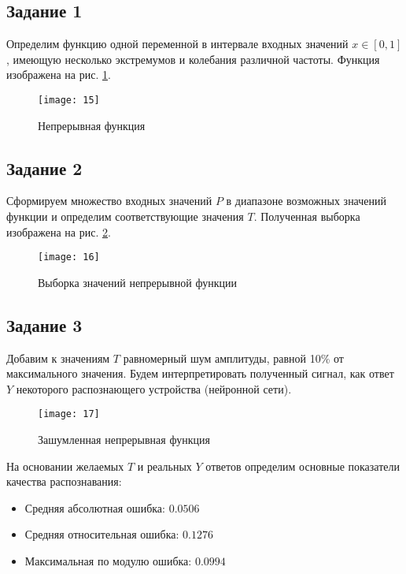 \subsection{Задание 1}

Определим функцию одной переменной в интервале входных значений $x \in [0, 1]$, имеющую несколько экстремумов и колебания различной частоты. Функция изображена на рис. \ref{fig:function}.

\begin{figure}[H]
\begin{center}
	\texttt{[image: 15]}
	\caption{Непрерывная функция}
	\label{fig:function}
\end{center}
\end{figure}

\subsection{Задание 2}

Сформируем множество входных значений $P$ в диапазоне возможных значений функции и определим соответствующие значения $T$. Полученная выборка изображена на рис. \ref{fig:function_sample}.

\begin{figure}[H]
\begin{center}
	\texttt{[image: 16]}
	\caption{Выборка значений непрерывной функции}
	\label{fig:function_sample}
\end{center}
\end{figure}

\subsection{Задание 3}

Добавим к значениям $T$ равномерный шум амплитуды, равной 10\% от максимального значения. Будем интерпретировать полученный сигнал, как ответ $Y$ некоторого распознающего устройства (нейронной сети).

\begin{figure}[H]
\begin{center}
	\texttt{[image: 17]}
	\caption{Зашумленная непрерывная функция}
	\label{fig:function_noise}
\end{center}
\end{figure}

На основании желаемых $T$ и реальных $Y$ ответов определим основные показатели качества распознавания:
\begin{itemize}
	\setlength\itemsep{0em}
	\item Средняя абсолютная ошибка: $0.0506$
	\item Средняя относительная ошибка: $0.1276$
	\item Максимальная по модулю ошибка: $0.0994$
\end{itemize}

